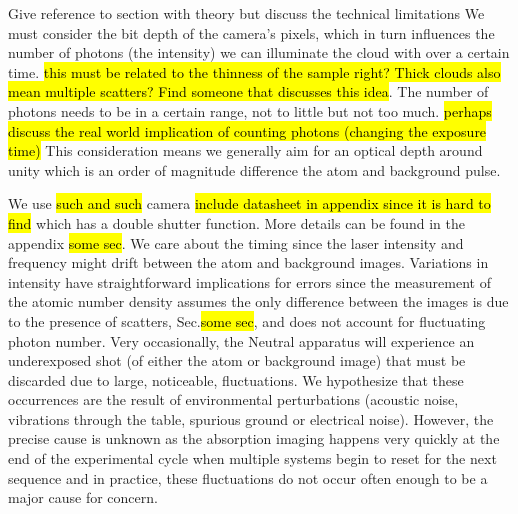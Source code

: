 Give reference to section with theory but discuss the technical limitations 
We must consider the bit depth of the camera's pixels, which in turn influences the number of photons (the intensity) we can illuminate the cloud with over a certain time. \hl{this must be related to the thinness of the sample right? Thick clouds also mean multiple scatters? Find someone that discusses this idea}.  The number of photons needs to be in a certain range, not to little but not too much. \hl{perhaps discuss the real world implication of counting photons (changing the exposure time)} 
This consideration means we generally aim for an optical depth around unity which is an order of magnitude difference the atom and background pulse. 

We use \hl{such and such} camera \hl{include datasheet in appendix since it is hard to find} which has a double shutter function. More details can be found in the appendix \hl{some sec}. We care about the timing since the laser intensity and frequency might drift between the atom and background images. Variations in intensity have straightforward implications for errors since the measurement of the atomic number density assumes the only difference between the images is due to the presence of scatters, Sec.\hl{some sec}, and does not account for fluctuating photon number. Very occasionally, the Neutral apparatus will experience an underexposed shot (of either the atom or background image) that must be discarded due to large, noticeable, fluctuations. We hypothesize that these occurrences are the result of environmental perturbations (acoustic noise, vibrations through the table, spurious ground or electrical noise). However, the precise cause is unknown as the absorption imaging happens very quickly at the end of the experimental cycle when multiple systems begin to reset for the next sequence and in practice, these fluctuations do not occur often enough to be a major cause for concern.

